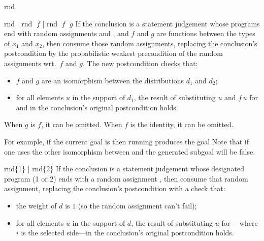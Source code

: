 \begin{tactic}{rnd}
  \begin{tsyntax}{rnd | rnd $\;f$ | rnd $\;f$ $\;g$} If the conclusion
    is a \prhl statement judgement whose programs end with random
    assignments  and , and $f$ and $g$ are functions between the types of
    $x_1$ and $x_2$, then consume those random assignments, replacing
    the conclusion's postcondition by the probabilistic weakest
    precondition of the random assignments wrt.\ $f$ and $g$.  The new
    postcondition checks that:
    \begin{itemize}
    \item $f$ and $g$ are an isomorphism between the distributions
      $d_1$ and $d_2$;

    \item for all elements $u$ in the support of $d_1$, the result
      of substituting $u$ and $f\,u$ for  and
       in the conclusion's original postcondition
      holds.
    \end{itemize}
    When $g$ is $f$, it can be omitted. When $f$ is the identity, it
    can be omitted.

    \bigskip For example, if the current goal is
     then
    running 
    produces the goal
    Note that if one uses the other isomorphism between  and
    \ec{[2..3]} the generated subgoal will be false.
  \end{tsyntax}

  \begin{tsyntax}{rnd\{1\} | rnd\{2\}}
    If the conclusion is a \prhl statement judgement whose designated
    program (1 or 2) ends with a random assignment 
    , then consume that random assignment,
    replacing the conclusion's postcondition with a check that:
    \begin{itemize}
    \item the weight of $d$ is $1$ (so the random assignment can't fail);

    \item for all elements $u$ in the support of $d$, the result
      of substituting $u$ for ---where $i$ is the
      selected side---in the conclusion's original
      postcondition holds.
    \end{itemize}


\end{tsyntax}
\end{tactic}
